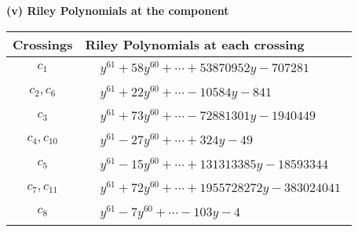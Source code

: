 \documentclass[1p]{elsarticle_modified}
\theoremstyle{definition}
\begin{document}
\newpage\renewcommand{\arraystretch}{1}
\flushleft \textbf{(v) Riley Polynomials at the component}\newline \\
\begin{tabular}{m{50pt}|m{274pt}}
Crossings & \hspace{64pt}Riley Polynomials at each crossing \\
\hline $$\begin{aligned}c_{1}\end{aligned}$$&$\begin{aligned}
&y^{61}+58 y^{60}+\cdots+53870952 y-707281
\end{aligned}$\\
\hline $$\begin{aligned}c_{2},c_{6}\end{aligned}$$&$\begin{aligned}
&y^{61}+22 y^{60}+\cdots-10584 y-841
\end{aligned}$\\
\hline $$\begin{aligned}c_{3}\end{aligned}$$&$\begin{aligned}
&y^{61}+73 y^{60}+\cdots-72881301 y-1940449
\end{aligned}$\\
\hline $$\begin{aligned}c_{4},c_{10}\end{aligned}$$&$\begin{aligned}
&y^{61}-27 y^{60}+\cdots+324 y-49
\end{aligned}$\\
\hline $$\begin{aligned}c_{5}\end{aligned}$$&$\begin{aligned}
&y^{61}-15 y^{60}+\cdots+131313385 y-18593344
\end{aligned}$\\
\hline $$\begin{aligned}c_{7},c_{11}\end{aligned}$$&$\begin{aligned}
&y^{61}+72 y^{60}+\cdots+1955728272 y-383024041
\end{aligned}$\\
\hline $$\begin{aligned}c_{8}\end{aligned}$$&$\begin{aligned}
&y^{61}-7 y^{60}+\cdots-103 y-4
\end{aligned}$\\

\end{tabular}
\end{document}
